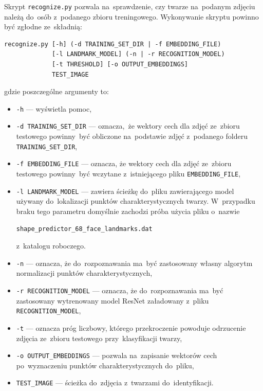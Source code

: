 \documentclass[11pt,a4paper]{article}
\begin{document}
Skrypt \texttt{recognize.py} pozwala na~sprawdzenie, czy twarze na~podanym zdjęciu należą do~osób z~podanego zbioru treningowego.
Wykonywanie skryptu powinno być zgłodne ze~składnią:

\begin{minipage}{\linewidth}
\begin{verbatim}
recognize.py [-h] (-d TRAINING_SET_DIR | -f EMBEDDING_FILE)
             [-l LANDMARK_MODEL] (-n | -r RECOGNITION_MODEL)
             [-t THRESHOLD] [-o OUTPUT_EMBEDDINGS]
             TEST_IMAGE
\end{verbatim}
\end{minipage}

gdzie poszczególne argumenty to:
\begin{itemize}
    \item \verb+-h+ --- wyświetla pomoc,
    \item \verb+-d TRAINING_SET_DIR+ --- oznacza, że wektory cech dla zdjęć ze~zbioru testowego powinny~być obliczone na~podstawie zdjęć z~podanego folderu \verb+TRAINING_SET_DIR+,
    \item \verb+-f EMBEDDING_FILE+ --- oznacza, że wektory cech dla zdjęć ze~zbioru testowego powinny~być wczytane z~istniejącego pliku \verb+EMBEDDING_FILE+,
    \item \verb+-l LANDMARK_MODEL+ --- zawiera ścieżkę do~pliku zawierającego model używany do~lokalizacji punktów charakterystycznych twarzy.
        W~przypadku braku tego parametru domyślnie zachodzi próba użycia pliku o~nazwie
        \begin{verbatim}shape_predictor_68_face_landmarks.dat\end{verbatim}
        z~katalogu roboczego.
    \item \verb+-n+ --- oznacza, że do~rozpoznawania ma~być zastosowany własny algorytm normalizacji punktów charakterystycznych,
    \item \verb+-r RECOGNITION_MODEL+ --- oznacza, że do~rozpoznawania ma~być zastosowany wytrenowany model ResNet załadowany z~pliku \verb+RECOGNITION_MODEL+,
    \item \verb+-t+ --- oznacza próg liczbowy, którego przekroczenie powoduje odrzucenie zdjęcia ze~zbioru testowego przy~klasyfikacji twarzy,
    \item \verb+-o OUTPUT_EMBEDDINGS+ --- pozwala na~zapisanie wektorów cech po~wyznaczeniu punktów charakterystycznych do~pliku,
    \item \verb+TEST_IMAGE+ --- ścieżka do~zdjęcia z~twarzami do~identyfikacji.
\end{itemize}
\end{document}
